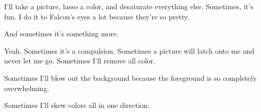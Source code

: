 

\begin{paracol}{2}
  \begin{leftcolumn}
I'll take a picture, lasso a color, and desaturate everything else. Sometimes, it's fun. I do it to Falcon's eyes a lot because they're so pretty.

\begin{ally}
And sometimes it's something more.
\end{ally}
Yeah. Sometimes it's a compulsion. Sometimes a picture will latch onto me and never let me go. Sometimes I'll remove all color.
\end{leftcolumn}
\end{paracol}


% 



\begin{paracol}{2}
  \begin{leftcolumn}
Sometimes I'll blow out the background because the foreground is so completely overwhelming.
\end{leftcolumn}
\end{paracol}



\null
\vfill
Sometimes I'll skew colors all in one direction.
\vfill



\vfill
\newpage

